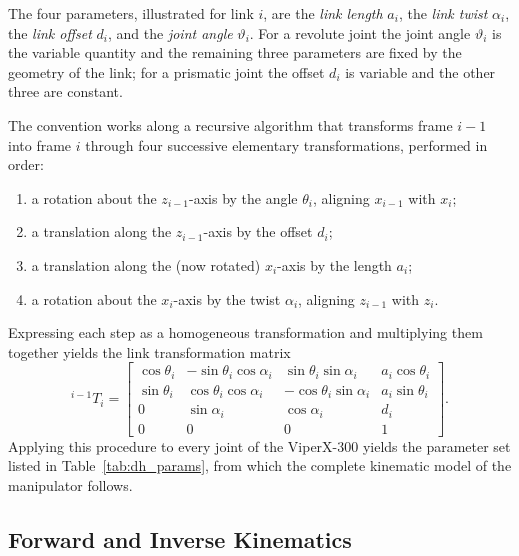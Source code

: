 The four parameters, illustrated for link $i$, are the \textit{link length} $a_i$,
the \textit{link twist} $\alpha_i$, the \textit{link offset} $d_i$, and the
\textit{joint angle} $\vartheta_i$. For a revolute joint the joint angle
$\vartheta_i$ is the variable quantity and the remaining three parameters are fixed
by the geometry of the link; for a prismatic joint the offset $d_i$ is variable and
the other three are constant.

The convention works along a recursive algorithm that transforms frame $i{-}1$ into
frame $i$ through four successive elementary transformations, performed in order:
\begin{enumerate}
    \item a rotation about the $z_{i-1}$-axis by the angle $\theta_i$, aligning
          $x_{i-1}$ with $x_i$;
    \item a translation along the $z_{i-1}$-axis by the offset $d_i$;
    \item a translation along the (now rotated) $x_i$-axis by the length $a_i$;
    \item a rotation about the $x_i$-axis by the twist $\alpha_i$, aligning
          $z_{i-1}$ with $z_i$.
\end{enumerate}
Expressing each step as a homogeneous transformation and multiplying them together
yields the link transformation matrix
\begin{equation}
^{i-1}T_i = \begin{bmatrix}
\cos\theta_i & -\sin\theta_i\cos\alpha_i & \sin\theta_i\sin\alpha_i & a_i\cos\theta_i \\
\sin\theta_i & \cos\theta_i\cos\alpha_i & -\cos\theta_i\sin\alpha_i & a_i\sin\theta_i \\
0 & \sin\alpha_i & \cos\alpha_i & d_i \\
0 & 0 & 0 & 1
\end{bmatrix}.
\label{eq:dh_matrix}
\end{equation}
Applying this procedure to every joint of the ViperX-300 yields the parameter set
listed in Table~\ref{tab:dh_params}, from which the complete kinematic model of the
manipulator follows.

\subsection{Forward and Inverse Kinematics}

